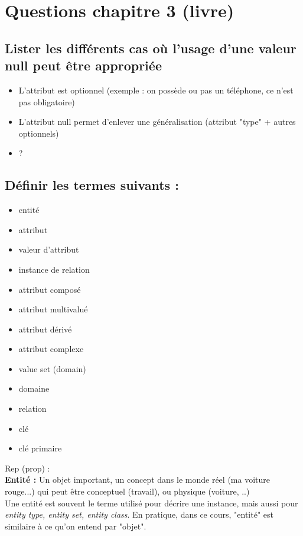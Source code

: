 \section{Questions chapitre 3 (livre)}

\subsection{Lister les différents cas où l'usage d'une valeur null peut être appropriée}
\begin{itemize}
\item L'attribut est optionnel (exemple : on possède ou pas un téléphone, ce n'est pas obligatoire)
\item L'attribut null permet d'enlever une généralisation (attribut "type" + autres optionnels)
\item ? 
\end{itemize}

\subsection{Définir les termes suivants :}

\begin{itemize}
	\item entité
	\item attribut
	\item valeur d'attribut
	\item instance de relation
	\item attribut composé 
	\item attribut multivalué
	\item attribut dérivé
	\item attribut complexe
	\item value set (domain)
	\item domaine
	\item relation
	\item clé
	\item clé primaire
\end{itemize}

\noindent
Rep (prop) :\\ 

\textbf{Entité :} 
Un objet important, un concept dans le monde réel (ma voiture rouge...) qui peut être conceptuel (travail), ou physique (voiture, ..) \\
Une entité est souvent le terme utilisé pour décrire une instance, mais aussi pour \textit{entity type, entity set, entity class}.
En pratique, dans ce cours, "entité" est similaire à ce qu'on entend par "objet".


